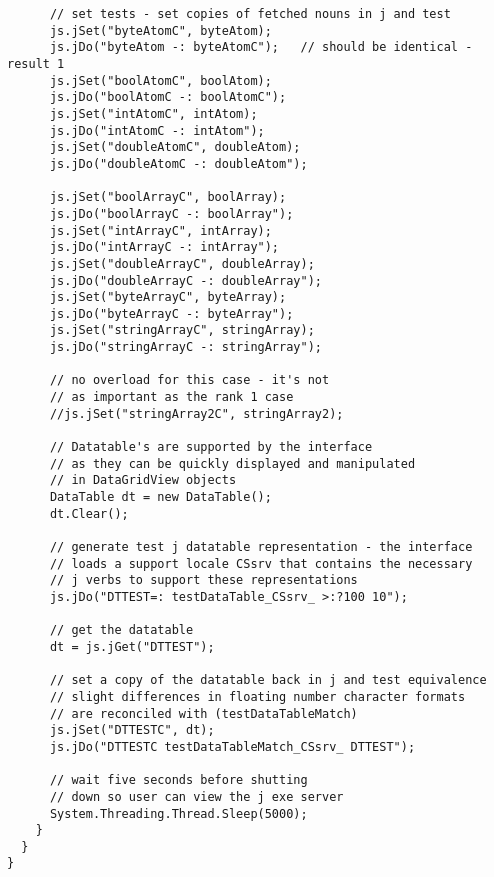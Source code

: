 \begin{lstlisting}
      // set tests - set copies of fetched nouns in j and test
      js.jSet("byteAtomC", byteAtom);
      js.jDo("byteAtom -: byteAtomC");   // should be identical - result 1
      js.jSet("boolAtomC", boolAtom);
      js.jDo("boolAtomC -: boolAtomC");
      js.jSet("intAtomC", intAtom);
      js.jDo("intAtomC -: intAtom");
      js.jSet("doubleAtomC", doubleAtom);
      js.jDo("doubleAtomC -: doubleAtom");

      js.jSet("boolArrayC", boolArray);
      js.jDo("boolArrayC -: boolArray");
      js.jSet("intArrayC", intArray);
      js.jDo("intArrayC -: intArray");
      js.jSet("doubleArrayC", doubleArray);
      js.jDo("doubleArrayC -: doubleArray");
      js.jSet("byteArrayC", byteArray);
      js.jDo("byteArrayC -: byteArray");
      js.jSet("stringArrayC", stringArray);
      js.jDo("stringArrayC -: stringArray");

      // no overload for this case - it's not
      // as important as the rank 1 case
      //js.jSet("stringArray2C", stringArray2);

      // Datatable's are supported by the interface
      // as they can be quickly displayed and manipulated
      // in DataGridView objects
      DataTable dt = new DataTable();
      dt.Clear();

      // generate test j datatable representation - the interface
      // loads a support locale CSsrv that contains the necessary
      // j verbs to support these representations
      js.jDo("DTTEST=: testDataTable_CSsrv_ >:?100 10");

      // get the datatable
      dt = js.jGet("DTTEST");

      // set a copy of the datatable back in j and test equivalence
      // slight differences in floating number character formats
      // are reconciled with (testDataTableMatch)
      js.jSet("DTTESTC", dt);
      js.jDo("DTTESTC testDataTableMatch_CSsrv_ DTTEST");

      // wait five seconds before shutting
      // down so user can view the j exe server
      System.Threading.Thread.Sleep(5000);
    }
  }
}
\end{lstlisting}
\lstset{style=resetdefaults}




%